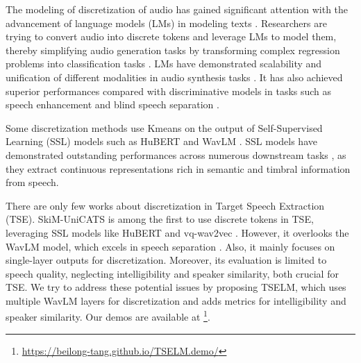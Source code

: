 \documentclass[conference]{IEEEtran}
\begin{document}
The modeling of discretization of audio has gained significant attention with the advancement of language models (LMs) in modeling texts \cite{l1, l2, l3, l4, l5}. Researchers are trying to convert audio into discrete tokens and leverage LMs to 
model them, thereby simplifying audio generation tasks by transforming complex regression problems into classification tasks \cite{dasb}.
LMs have demonstrated scalability and unification of different modalities in audio synthesis tasks \cite{audio_gen,deshmukh2023pengi,chen2023lauragpt}. It has also achieved superior performances compared with discriminative models in
tasks such as speech enhancement \cite{selm,mask_sr} and blind speech separation \cite{tokensplit}.

Some discretization methods \cite{selm,tokensplit,dasb} use Kmeans on the output of Self-Supervised Learning (SSL) models such as HuBERT \cite{hubert} and WavLM \cite{wavlm}. SSL models have demonstrated outstanding performances across numerous downstream tasks \cite{superb}, as they extract continuous representations rich in semantic and timbral information from speech.

There are only few works about discretization in Target Speech Extraction (TSE). SkiM-UniCATS \cite{gen_tse} is among the first to use discrete tokens in TSE, leveraging SSL models like HuBERT and vq-wav2vec \cite{vq_wav2vec}. However, it overlooks the WavLM model, which excels in speech separation \cite{wavlm}. Also, it mainly focuses on single-layer outputs for discretization. Moreover, its evaluation is limited to speech quality, neglecting intelligibility and speaker similarity, both crucial for TSE. We try to address these potential issues by proposing TSELM, which uses multiple WavLM layers for discretization and adds metrics for intelligibility and speaker similarity. Our demos are available at 
\footnote{\href{https://beilong-tang.github.io/TSELM.demo/}{https://beilong-tang.github.io/TSELM.demo/}}.
\end{document}
